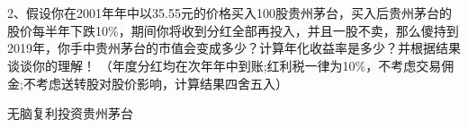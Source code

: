 
\chapter{}

2、假设你在2001年年中以35.55元的价格买入100股贵州茅台，买入后贵州茅台的股价每半年下跌10\%，期间你将收到分红全部再投入，并且一股不卖，那么傻持到2019年，你手中贵州茅台的市值会变成多少？计算年化收益率是多少？并根据结果谈谈你的理解！ （年度分红均在次年年中到账;红利税一律为10\%，不考虑交易佣金;不考虑送转股对股价影响，计算结果四舍五入）
\hspace*{\fill} \\

{\kai
\begin{table}[H]
\caption{无脑复利投资贵州茅台}
\label{tb}
\centering
\scalebox{0.6}{

}
\end{table}




}
